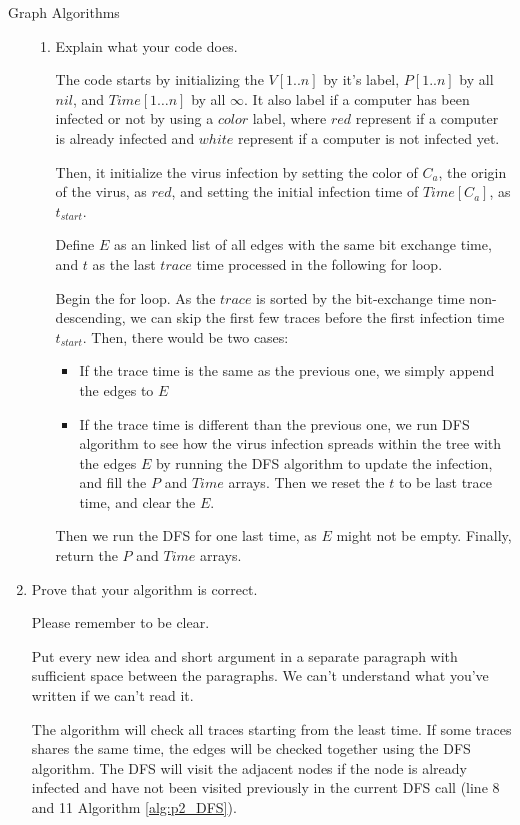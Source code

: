 \documentclass{article}
\numberwithin{table}{section}
\numberwithin{figure}{section}
\begin{document}
\begin{section}{Graph Algorithms}
\begin{enumerate}
\begin{enumerate}
        \item Explain what your code does.
        \begin{tcolorbox}
        The code starts by initializing the $V[1..n]$ by it's label, $P[1 .. n]$ by all $nil$, and $Time[1\dots n]$ by all $\infty$. It also label if a computer has been infected or not by using a $color$ label, where $red$ represent if a computer is already infected and $white$ represent if a computer is not infected yet.
        
        Then, it initialize the virus infection by setting the color of $C_a$, the origin of the virus, as $red$, and setting the initial infection time of $Time[C_a]$, as $t_{start}$.
        
        Define $E$ as an linked list of all edges with the same bit exchange time, and $t$ as the last $trace$ time processed in the following for loop.
        
        Begin the for loop. As the $trace$ is sorted by the bit-exchange time non-descending, we can skip the first few traces before the first infection time $t_{start}$. 
        Then, there would be two cases:
        \begin{itemize}
            \item If the trace time is the same as the previous one, we simply append the edges to $E$
            \item If the trace time is different than the previous one, we run DFS algorithm to see how the virus infection spreads within the tree with the edges $E$ by running the DFS algorithm to update the infection, and fill the $P$ and $Time$ arrays. Then we reset the $t$ to be last trace time, and clear the $E$.
        \end{itemize}
        Then we run the DFS for one last time, as $E$ might not be empty. 
        Finally, return the $P$ and $Time$ arrays.
        \end{tcolorbox}
        
    \end{enumerate}
    \item Prove that your algorithm is correct.

    Please remember to be clear.
    
    Put every new idea and short argument in a separate paragraph with sufficient space between the paragraphs. We can’t understand what you’ve written if we can’t read it.
    
    \begin{tcolorbox}
    The algorithm will check all traces starting from the least time. If some traces shares the same time, the edges will be checked together using the DFS algorithm. The DFS will visit the adjacent nodes if the node is already infected and have not been visited previously in the current DFS call (line 8 and 11 Algorithm \ref{alg:p2_DFS}).
    

\end{tcolorbox}
\end{enumerate}
\end{section}
\end{document}
